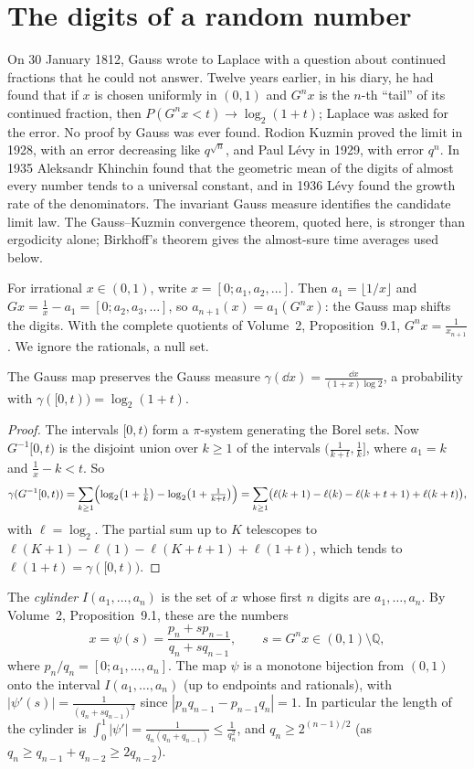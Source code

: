 \section{The digits of a random number}

On 30 January 1812, Gauss wrote to Laplace with a question about continued fractions that he could not answer. Twelve years earlier, in his diary, he had found that if $x$ is chosen uniformly in $(0,1)$ and
$G^n x$ is the $n$-th ``tail'' of its continued fraction, then $P(G^nx<t)\to\log_2(1+t)$; Laplace was asked for the error. No proof by Gauss was ever found. Rodion Kuzmin proved the limit in 1928, with an error decreasing
like $q^{\sqrt n}$, and Paul L\'evy in 1929, with error $q^n$. In 1935 Aleksandr Khinchin found that the geometric mean of the digits of almost every number tends to a universal constant, and in 1936 L\'evy found the growth rate of the
denominators. The invariant Gauss measure identifies the candidate limit law. The Gauss--Kuzmin convergence theorem, quoted here, is stronger than ergodicity alone; Birkhoff's theorem gives the almost-sure time averages used below.

For irrational $x\in(0,1)$, write $x=[0;a_1,a_2,\dots]$. Then $a_1=\lfloor1/x\rfloor$ and $Gx=\frac1x-a_1=[0;a_2,a_3,\dots]$, so $a_{n+1}(x)=a_1(G^nx)$: the Gauss map shifts the digits. With the complete quotients of Volume~2, Proposition~9.1,
$G^nx=\frac1{x_{n+1}}$. We ignore the rationals, a null set.

\begin{proposition}[Gauss]\label{prop:gaussmeasure}
The Gauss map preserves the Gauss measure $\gamma(\dd x)=\frac{\dd x}{(1+x)\log2}$, a probability with $\gamma([0,t))=\log_2(1+t)$.
\end{proposition}
\begin{proof}
The intervals $[0,t)$ form a $\pi$-system generating the Borel sets. Now $G^{-1}[0,t)$ is the disjoint union over $k\ge1$ of the intervals $(\frac1{k+t},\frac1k]$, where $a_1=k$ and $\frac1x-k<t$. So
\[
\gamma(G^{-1}[0,t))=\sum_{k\ge1}\Bigl(\log_2\bigl(1+\tfrac1k\bigr)-\log_2\bigl(1+\tfrac1{k+t}\bigr)\Bigr)=\sum_{k\ge1}\bigl(\ell(k+1)-\ell(k)-\ell(k+t+1)+\ell(k+t)\bigr),
\]
with $\ell=\log_2$. The partial sum up to $K$ telescopes to $\ell(K+1)-\ell(1)-\ell(K+t+1)+\ell(1+t)$, which tends to $\ell(1+t)=\gamma([0,t))$.
\end{proof}

The \emph{cylinder} $I(a_1,\dots,a_n)$ is the set of $x$ whose first $n$ digits are $a_1,\dots,a_n$. By Volume~2, Proposition~9.1, these are the numbers
\[
x=\psi(s)=\frac{p_n+sp_{n-1}}{q_n+sq_{n-1}},\qquad s=G^nx\in(0,1)\setminus\mathbb Q,
\]
where $p_n/q_n=[0;a_1,\dots,a_n]$. The map $\psi$ is a monotone bijection from $(0,1)$ onto the interval $I(a_1,\dots,a_n)$ (up to endpoints and rationals), with $|\psi'(s)|=\frac1{(q_n+sq_{n-1})^2}$ since $|p_nq_{n-1}-p_{n-1}q_n|=1$. In particular the length of
the cylinder is $\int_0^1|\psi'|=\frac1{q_n(q_n+q_{n-1})}\le\frac1{q_n^2}$, and $q_n\ge2^{(n-1)/2}$ (as $q_n\ge q_{n-1}+q_{n-2}\ge2q_{n-2}$).

